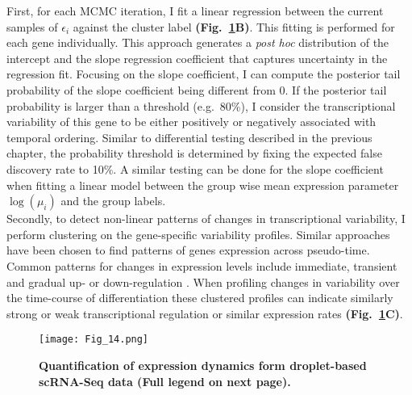 First, for each MCMC iteration, I fit a linear regression between the current samples of $\epsilon_i$ against the cluster label \textbf{(Fig.~\ref{fig3:variability_schematic}B)}. This fitting is performed for each gene individually. This approach generates a \emph{post hoc} distribution of the intercept and the slope regression coefficient that captures uncertainty in the regression fit. Focusing on the slope coefficient, I can compute the posterior tail probability of the slope coefficient being different from 0. If the posterior tail probability is larger than a threshold (e.g.~80\%), I consider the transcriptional variability of this gene to be either positively or negatively associated with temporal ordering. Similar to differential testing described in the previous chapter, the probability threshold is determined by fixing the expected false discovery rate to 10\%. A similar testing can be done for the slope coefficient when fitting a linear model between the group wise mean expression parameter $\log(\mu_i)$ and the group labels.\\

Secondly, to detect non-linear patterns of changes in transcriptional variability, I perform clustering on the gene-specific variability profiles. Similar approaches have been chosen to find patterns of genes expression across pseudo-time. Common patterns for changes in expression levels include immediate, transient and gradual up- or down-regulation \citep{Trapnell2014}. When profiling changes in variability over the time-course of differentiation these clustered profiles can indicate similarly strong or weak transcriptional regulation or similar expression rates \textbf{(Fig.~\ref{fig3:variability_schematic}C)}.

\newpage

\begin{figure}[!h]
\centering
\texttt{[image: Fig\_14.png]}
\caption[Quantification of expression dynamics form droplet-based scRNA-Seq data]{\textbf{Quantification of expression dynamics form droplet-based scRNA-Seq data (Full legend on next page).}}
\label{fig3:variability_schematic}
\end{figure}

\newpage

